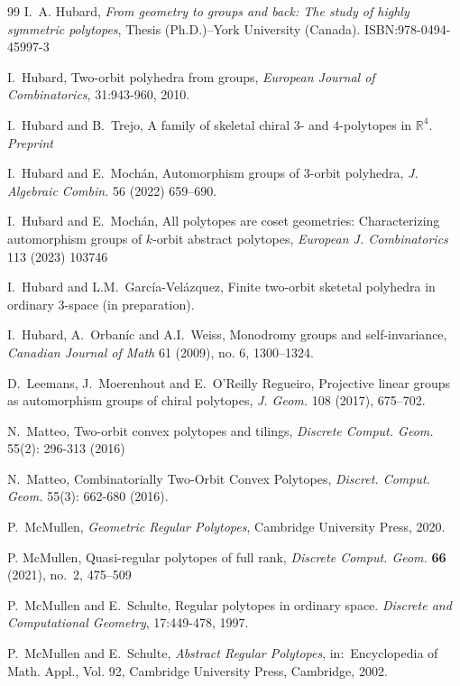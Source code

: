 \documentclass[12pt]{article}
\renewcommand{\>}{\rangle}
\theoremstyle{definition}\newtheorem{definition}{Definition}[section]
\begin{document}
\begin{thebibliography}{99}
I.~A. Hubard, {\it From geometry to groups and back: The study of highly symmetric polytopes}, Thesis (Ph.D.)–York University (Canada). ISBN:978-0494-45997-3

I.~Hubard, Two-orbit polyhedra from groups, \textit{European Journal of Combinatorics}, 31:943-960, 2010.

I.~Hubard and B.~Trejo, A family of skeletal chiral $3$- and $4$-polytopes in $\mathbb{R}^4$. \textit{Preprint}

I.~Hubard and E.~Mochán, Automorphism groups of 3-orbit polyhedra, \textit{J. Algebraic Combin.} 56 (2022) 659--690.

 I.~Hubard and E.~Moch\'an, All polytopes are coset geometries: Characterizing automorphism groups of $k$-orbit abstract polytopes, \textit{European J. Combinatorics} 113 (2023) 103746

I.~Hubard and L.M.~García-Velázquez, Finite two-orbit sketetal polyhedra in ordinary 3-space (in preparation).

 I.~Hubard, A.~Orban\'{i}c and A.I.~Weiss, Monodromy groups and self-invariance, {\em Canadian Journal of Math\/}  61 (2009), no. 6, 1300--1324.

D.~Leemans, J.~Moerenhout and E.~O’Reilly Regueiro, Projective linear groups as automorphism groups of chiral polytopes, \textit{J. Geom.} 108 (2017), 675--702.

 N.~Matteo, Two-orbit convex polytopes and tilings, \textit{Discrete Comput. Geom.} 55(2): 296-313 (2016)

 N.~Matteo, Combinatorially Two-Orbit Convex Polytopes, \textit {Discret. Comput. Geom.} 55(3): 662-680 (2016).

P.~McMullen, \textit{Geometric Regular Polytopes}, Cambridge University Press, 2020.

P. McMullen, Quasi-regular polytopes of full rank, \textit{Discrete Comput. Geom.} {\bf 66} (2021), no.~2, 475--509

P.~McMullen and E.~Schulte, Regular polytopes in ordinary space. \textit{Discrete and Computational Geometry}, 17:449-478, 1997.

P.~McMullen and E.~Schulte, {\em Abstract Regular Polytopes\/}, in:\ Encyclopedia of Math.  Appl., Vol. 92, Cambridge University Press, Cambridge, 2002.


\end{thebibliography}
\end{document}
